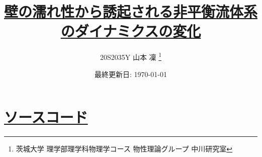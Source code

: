\documentclass[dvipdfmx]{jsreport}
\begin{document}
\title{\href{https://github.com/m-agnet/Report.git}{壁の濡れ性から誘起される非平衡流体系のダイナミクスの変化}}
\author{20S2035Y 山本 凜 \thanks{茨城大学 理学部理学科物理学コース 物性理論グループ 中川研究室}}
\date{最終更新日: \today}
\maketitle

\newpage
\setcounter{tocdepth}{3}
\tableofcontents
\newpage








\appendix
\chapter{\href{https://github.com/m-agnet/Report.git}{ソースコード}}






\end{document}
